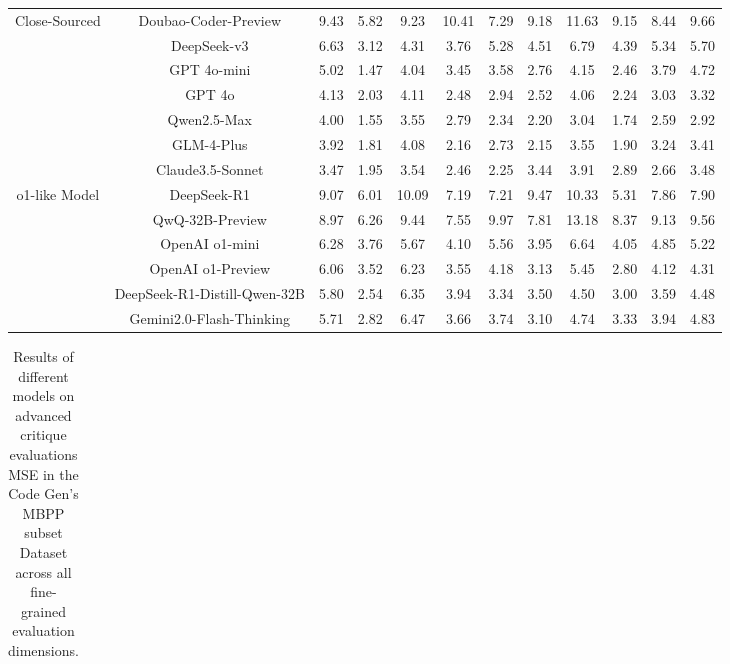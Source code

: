 \documentclass[11pt, a4paper, logo, copyright, nonumbering, amsart]{map}
\begin{document}
\begin{CJK*}{UTF8}{gbsn}
\begin{table*}[h!]
\begin{adjustbox}{width=\textwidth}
\begin{tabular}{c|c|cccccccccc}
    \midrule
    \multirow{7}{*}{Close-Sourced} 
    & Doubao-Coder-Preview & 9.43 & 5.82 & 9.23 & 10.41 & 7.29 & 9.18 & 11.63 & 9.15 & 8.44 & 9.66 \\
    & DeepSeek-v3 & 6.63 & 3.12 & 4.31 & 3.76 & 5.28 & 4.51 & 6.79 & 4.39 & 5.34 & 5.70 \\
    & GPT 4o-mini & 5.02 & 1.47 & 4.04 & 3.45 & 3.58 & 2.76 & 4.15 & 2.46 & 3.79 & 4.72 \\
    & GPT 4o & 4.13 & 2.03 & 4.11 & 2.48 & 2.94 & 2.52 & 4.06 & 2.24 & 3.03 & 3.32 \\
    & Qwen2.5-Max & 4.00 & 1.55 & 3.55 & 2.79 & 2.34 & 2.20 & 3.04 & 1.74 & 2.59 & 2.92 \\
    & GLM-4-Plus & 3.92 & 1.81 & 4.08 & 2.16 & 2.73 & 2.15 & 3.55 & 1.90 & 3.24 & 3.41 \\
    & Claude3.5-Sonnet & 3.47 & 1.95 & 3.54 & 2.46 & 2.25 & 3.44 & 3.91 & 2.89 & 2.66 & 3.48 \\
    
    \midrule
    \multirow{6}{*}{o1-like Model} 
    & DeepSeek-R1 & 9.07 & 6.01 & 10.09 & 7.19 & 7.21 & 9.47 & 10.33 & 5.31 & 7.86 & 7.90 \\
    & QwQ-32B-Preview & 8.97 & 6.26 & 9.44 & 7.55 & 9.97 & 7.81 & 13.18 & 8.37 & 9.13 & 9.56 \\
    & OpenAI o1-mini & 6.28 & 3.76 & 5.67 & 4.10 & 5.56 & 3.95 & 6.64 & 4.05 & 4.85 & 5.22 \\
    & OpenAI o1-Preview & 6.06 & 3.52 & 6.23 & 3.55 & 4.18 & 3.13 & 5.45 & 2.80 & 4.12 & 4.31 \\
    & DeepSeek-R1-Distill-Qwen-32B & 5.80 & 2.54 & 6.35 & 3.94 & 3.34 & 3.50 & 4.50 & 3.00 & 3.59 & 4.48 \\
    & Gemini2.0-Flash-Thinking & 5.71 & 2.82 & 6.47 & 3.66 & 3.74 & 3.10 & 4.74 & 3.33 & 3.94 & 4.83 \\
    \bottomrule
    \end{tabular}
    \end{adjustbox}
\end{table*}

\begin{table*}[h!]
    \centering
    \caption{Results of different models on advanced critique evaluations MSE in the Code Gen's MBPP subset Dataset across all fine-grained evaluation dimensions.} \label{table:algo_level2_mbpp_dim}
    \begin{adjustbox}{width=\textwidth}
    \begin{tabular}{c|c|cccccccccc}
    

\end{tabular}
\end{adjustbox}
\end{table*}
\end{CJK*}
\end{document}
